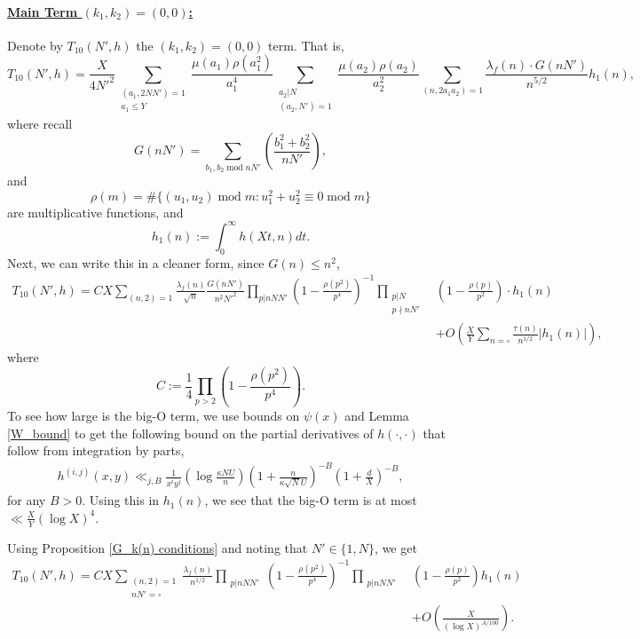 \documentclass[12pt]{amsart}
\def\mod{\operatorname{mod}}
\def\log{\operatorname{log}}
\begin{document}
\paragraph{\underline{Main Term $(k_1,k_2)=(0,0)$:}}
Denote by $T_{10}(N',h)$ the $(k_1,k_2)=(0,0)$ term. That is,
$$ T_{10}(N',h) = \frac{X}{4N'^2} \sum_{\substack{(a_1,2NN')=1\\a_1\leq Y}}\frac{\mu(a_1)\rho(a_1^2)}{a_1^4}\sum_{\substack{a_2|N \\ (a_2,N')=1 }}\frac{\mu(a_2)\rho(a_2)}{a_2^2}\sum_{(n,2a_1a_2)= 1}\frac{\lambda_f(n) \cdot G(nN')} {n^{5/2}} h_1(n) , $$
where recall
$$ G(nN') = \sum_{b_1,b_2\mod nN'} \left(\frac{b_1^2+b_2^2}{nN'}\right) ,$$
and $$\rho(m)=\#\{ (u_1,u_2)\mod m : u_1^2+u_2^2\equiv 0 \mod m \}$$ are multiplicative functions, and
$$ h_1(n):=\int_0^{\infty} h(Xt,n) dt. $$
Next, we can write this in a cleaner form, since $G(n) \leq n^2$,
\begin{align*}
T_{10}(N',h) = C X \sum_{(n,2)=1}\frac{\lambda_f(n) }{\sqrt{n}}\frac{ G(nN')}{n^2N'^2} \prod_{p|nNN'} \left( 1 - \frac{\rho(p^2)}{p^4}\right)^{-1} \prod_{\substack{p|N \\ p\nmid nN'}} &\left(1  - \frac{\rho(p)}{p^2} \right) \cdot h_1(n) \\
&+ O\left( \frac{X}{Y} \sum_{n=\square}\frac{\tau(n)} {n^{1/2}} |h_1(n)| \right), 
\end{align*}
where
$$C :=\frac{1}{4}  \prod_{p>2} \left( 1- \frac{\rho(p^2)}{p^4} \right). $$
To see how large is the big-O term, we use bounds on $\psi(x)$ and Lemma \ref{W_bound} to get the following bound on the partial derivatives of $h(\cdot,\cdot)$ that follow from integration by parts,
\begin{align}\label{h_bound}
h^{(i,j)}(x,y)\ll_{j,B} \frac{1}{x^iy^j}\left(\log\frac{\kappa N U}{n}\right)\left(1+\frac{n}{\kappa \sqrt{N}U}\right)^{-B}\left(1+\frac{d}{X}
\right)^{-B},\end{align}
  for any $B>0$. Using this in $h_1(n)$, we see that the big-O term is at most $\ll \frac{X}{Y}(\log X)^4$.

Using Proposition \ref{G_k(n) conditions} and noting that $N'\in \{1, N\}$, we get
\begin{align*}
 T_{10}(N',h) = C X \sum_{\substack{(n,2)=1 \\ nN'=\square}}\frac{\lambda_f(n)} {n^{1/2}} \prod_{\substack{p|nNN'}} \left( 1 - \frac{\rho(p^2)}{p^4}\right)^{-1} \prod_{\substack{p|nNN'}} &\left(1  - \frac{\rho(p)}{p^2} \right) h_1(n) \\
 &+ O\left( \frac{X}{(\log X)^{A/100}} \right).
 \end{align*}
\end{document}
